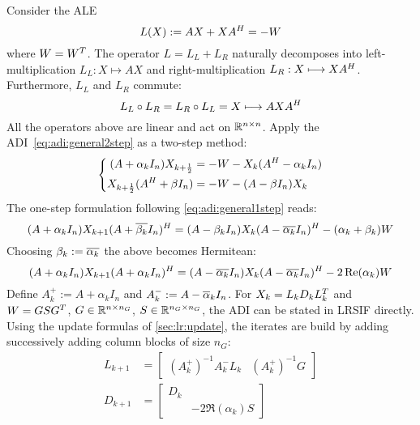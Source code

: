 Consider the \ac{ALE}
\begin{equation*}
\label{eq:adi:ale}
  L(X) := AX + XA^H = -W
\end{equation*}
where $W = W^T$.
The \Lyapunov operator $L = L_L + L_R$ naturally decomposes into
left-multiplication $L_L : X \mapsto AX$ and
right-multiplication $L_R : X \longmapsto XA^H$.
Furthermore, $L_L$ and $L_R$ commute:
\begin{equation*}
  L_L \circ L_R = L_R \circ L_L = X \longmapsto AXA^H
\end{equation*}
All the operators above are linear and act on $\mathbb{R}^{n\times n}$.
Apply the \ac{ADI}~\eqref{eq:adi:general2step} as a two-step method:
\begin{equation}
  \left\{
  \begin{aligned}
    (A + \alpha_k I_n) X_{k+\frac{1}{2}} &= -W - X_k (A^H - \alpha_k I_n) \\
    X_{k+\frac{1}{2}} (A^H + \beta I_n) &= -W - (A - \beta I_n) X_k
  \end{aligned}
  \right.
\end{equation}
The one-step formulation following \eqref{eq:adi:general1step} reads:
\begin{equation}
  (A + \alpha_k I_n)
  X_{k+1}
  (A + \conj{\beta_k} I_n)^\HT
  =
  (A - \beta_k I_n)
  X_k
  (A - \conj{\alpha_k} I_n)^\HT
  - (\alpha_k + \beta_k)
  W
\end{equation}
Choosing $\beta_k := \conj{\alpha_k}$
the above becomes Hermitean:
\begin{equation}
\label{eq:adi:ale1step}
  (A + \alpha_k I_n)
  X_{k+1}
  (A + \alpha_k I_n)^\HT
  =
  (A - \conj{\alpha_k} I_n)
  X_k
  (A - \conj{\alpha_k} I_n)^\HT
  - 2\Re(\alpha_k)
  W
\end{equation}
Define
$A^+_k := A + \alpha_k I_n$ and
$A^-_k := A - \conj\alpha_k I_n$.
For $X_k = L_k D_k L_k^T$ and $W = GSG^T$,
$G\in\mathbb{R}^{n\times n_G}$,
$S\in\mathbb{R}^{n_G\times n_G}$,
the \ac{ADI} can be stated in \ac{LRSIF} directly.
Using the update formulas of \autoref{sec:lr:update},
the iterates are build by adding successively adding column blocks of size $n_G$:
\begin{align*}
  L_{k+1} &= \begin{bmatrix}
    (A^+_k)^{-1} A^-_k L_k &
    (A^+_k)^{-1} G
  \end{bmatrix} \\
  D_{k+1} &= \begin{bmatrix}
    D_k \\
    & -2\Re(\alpha_k) S
  \end{bmatrix}
\end{align*}

